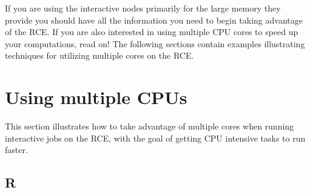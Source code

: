 \documentclass[
]{book}
\begin{document}
If you are using the interactive nodes primarily for the large memory
they provide you should have all the information you need to begin
taking advantage of the RCE. If you are also interested in using
multiple CPU cores to speed up your computations, read on! The following
sections contain examples illustrating techniques for utilizing multiple
cores on the RCE.

\hypertarget{using-multiple-cpus}{%
\section{Using multiple CPUs}\label{using-multiple-cpus}}

This section illustrates how to take advantage of multiple cores when
running interactive jobs on the RCE, with the goal of getting CPU
intensive tasks to run faster.

\hypertarget{r}{%
\subsection{R}\label{r}}
\end{document}
